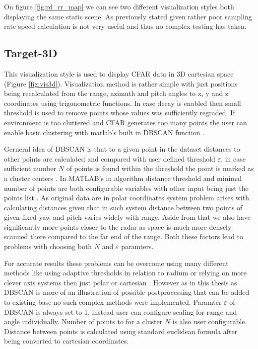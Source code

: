 On figure \ref{fig:rd_rr_map} we can see two different visualization styles both displaying the same static scene.
As previously stated given rather poor sampling rate speed calculation is not very useful and thus no complex testing has taken.

\subsection{Target-3D}

This visualization style is used to display CFAR data in 3D cartesian space (Figure \ref{fig:vis3d}).
Visualization method is rather simple with just positions being recalculated from the range, azimuth and pitch angles to x, y and z coordinates using trigonometric functions.
In case decay is enabled then small threshold is used to remove points whose values was sufficiently regraded.
If environment is too cluttered and CFAR generates too many points the user can enable basic clustering with matlab's built in DBSCAN function \cite{matlab_dbscan}.

Gerneral idea of DBSCAN is that to a given point in the dataset distances to other points are calculated and compared with user defined threshold $\varepsilon$, in case sufficient number $N$ of points is found within the threshold the point is marked as a cluster centers \cite{Kellner2012}.
In MATLAB's in algorithm distance threshold and minimal number of points are both configurable variables with other input being just the points list \cite{matlab_dbscan}.
As original data are in polar coordinates system problem arises with calculating distances given that in such system distance between two points of given fixed yaw and pitch varies widely with range.
Aside from that we also have significantly more points closer to the radar as space is much more densely scanned there compared to the far end of the range.
Both these factors lead to problems with choosing both $N$ and $\varepsilon$ paramters.

For accurate results these problems can be overcome using many different methods like using adaptive thresholds in relation to radium \cite{Kellner2012} or relying on more clever axis systems then just polar or cartesian \cite{Sun2024}.
However as in this thesis as DBSCAN is more of an illustration of possible postprocessing that can be added to existing base no such complex methods were implemented.
Paramter $\varepsilon$ of DBSCAN is always set to 1, instead user can configure scaling for range and angle individually.
Number of points to for a cluster $N$ is also user configurable.
Distance between points is calculated using standard euclidean formula after being converted to cartesian coordinates.

